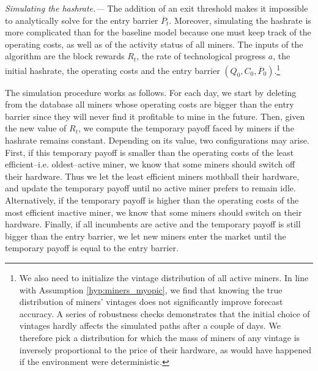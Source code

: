 \documentclass[12pt, a4paper]{article}
\begin{document}
\emph{Simulating the hashrate.---} The addition of an exit threshold makes it
impossible to analytically solve for the entry barrier $\overline{P}_t$. Moreover, simulating the hashrate is more
complicated than for the baseline model because one must keep track of the
operating costs, as well as of the activity status of all miners. The
inputs of the algorithm are the block rewards $R_t$, the rate of technological progress $a$, the initial
hashrate, the operating costs and the entry barrier $\left(Q_0,C_0,\overline{P}%
_0\right)$.\footnote{We also need to initialize the vintage distribution of all
active miners. In line
with Assumption \ref{hyp:miners_myopic}, we find that knowing the true distribution
of miners' vintages does not significantly improve forecast accuracy. A series of robustness checks demonstrates that the initial
choice of vintages hardly affects the simulated paths after a couple of days.
We therefore pick a distribution for which the mass of miners of
any vintage is inversely proportional to the price of their hardware, as
would have happened if the environment were deterministic.}

The simulation procedure works as follows. For each day, we start by
deleting from the database all miners whose operating costs are bigger
than the entry barrier since they will never find it profitable to mine in the future.
Then, given the new value of $R_t$, we compute the temporary payoff
faced by miners if the hashrate remains constant. Depending on its value, two
configurations may arise. First, if this temporary payoff is smaller than
the operating costs of the least efficient--i.e. oldest--active miner, we
know that some miners should switch off their hardware. Thus we let the
least efficient miners mothball their hardware, and update the temporary
payoff until no active miner prefers to remain idle. Alternatively, if the
temporary payoff is higher than the operating costs of the most efficient
inactive miner, we know that some miners should switch on their hardware.
Finally, if all incumbents are active and the temporary payoff is still
bigger than the entry barrier, we let new miners enter the market until the
temporary payoff is equal to the entry barrier.
\end{document}
